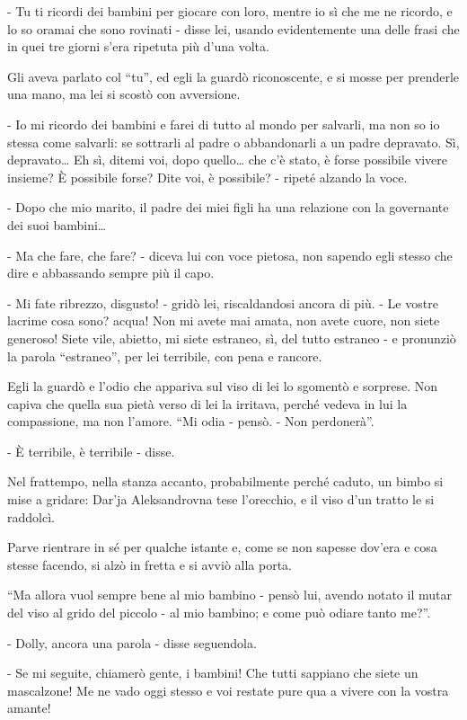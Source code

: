 - Tu ti ricordi dei bambini per giocare con loro, mentre io sì che me ne ricordo, e lo so oramai che sono rovinati - disse lei, usando evidentemente una delle frasi che in quei tre giorni s'era ripetuta più d'una volta. 

Gli aveva parlato col ``tu'', ed egli la guardò riconoscente, e si mosse per prenderle una mano, ma lei si scostò con avversione. 

- Io mi ricordo dei bambini e farei di tutto al mondo per salvarli, ma non so io stessa come salvarli: se sottrarli al padre o abbandonarli a un padre depravato. Sì, depravato\ldots{} Eh sì, ditemi voi, dopo quello\ldots{} che c'è stato, è forse possibile vivere insieme? È possibile forse? Dite voi, è possibile? - ripeté alzando la voce. 

- Dopo che mio marito, il padre dei miei figli ha una relazione con la governante dei suoi bambini\ldots{} 

- Ma che fare, che fare? - diceva lui con voce pietosa, non sapendo egli stesso che dire e abbassando sempre più il capo. 

- Mi fate ribrezzo, disgusto! - gridò lei, riscaldandosi ancora di più. - Le vostre lacrime cosa sono? acqua! Non mi avete mai amata, non avete cuore, non siete generoso! Siete vile, abietto, mi siete estraneo, sì, del tutto estraneo - e pronunziò la parola ``estraneo'', per lei terribile, con pena e rancore. 

Egli la guardò e l'odio che appariva sul viso di lei lo sgomentò e sorprese. Non capiva che quella sua pietà verso di lei la irritava, perché vedeva in lui la compassione, ma non l'amore. ``Mi odia - pensò. - Non perdonerà''. 

- È terribile, è terribile - disse. 

Nel frattempo, nella stanza accanto, probabilmente perché caduto, un bimbo si mise a gridare: Dar'ja Aleksandrovna tese l'orecchio, e il viso d'un tratto le si raddolcì. 

Parve rientrare in sé per qualche istante e, come se non sapesse dov'era e cosa stesse facendo, si alzò in fretta e si avviò alla porta. 

``Ma allora vuol sempre bene al mio bambino - pensò lui, avendo notato il mutar del viso al grido del piccolo - al mio bambino; e come può odiare tanto me?''. 

- Dolly, ancora una parola - disse seguendola. 

- Se mi seguite, chiamerò gente, i bambini! Che tutti sappiano che siete un mascalzone! Me ne vado oggi stesso e voi restate pure qua a vivere con la vostra amante! 

